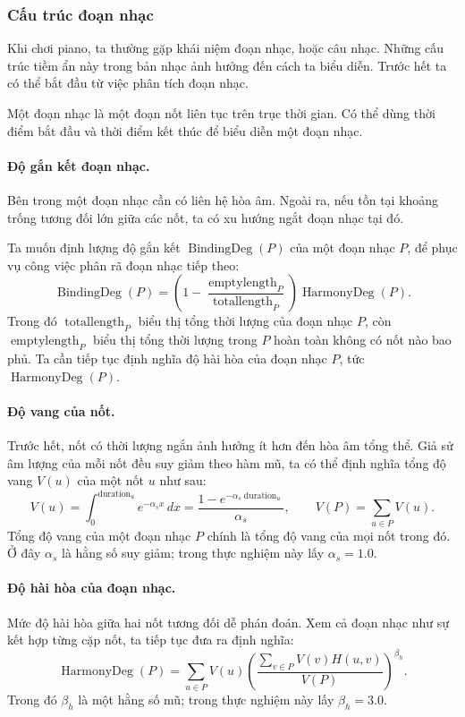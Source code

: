 \documentclass[11pt]{article}
\begin{document}
\subsubsection{Cấu trúc đoạn nhạc}

Khi chơi piano, ta thường gặp khái niệm đoạn nhạc, hoặc câu nhạc. Những cấu
trúc tiềm ẩn này trong bản nhạc ảnh hưởng đến cách ta biểu diễn. Trước hết ta
có thể bắt đầu từ việc phân tích đoạn nhạc.

Một đoạn nhạc là một đoạn nốt liên tục trên trục thời gian. Có thể dùng thời
điểm bắt đầu và thời điểm kết thúc để biểu diễn một đoạn nhạc.

\paragraph{Độ gắn kết đoạn nhạc.}
Bên trong một đoạn nhạc cần có liên hệ hòa âm. Ngoài ra, nếu tồn tại khoảng
trống tương đối lớn giữa các nốt, ta có xu hướng ngắt đoạn nhạc tại đó.

Ta muốn định lượng độ gắn kết \(\operatorname{BindingDeg}(P)\) của một đoạn
nhạc \(P\), để phục vụ công việc phân rã đoạn nhạc tiếp theo:
\[
  \operatorname{BindingDeg}(P)=
  \left(1-\frac{\operatorname{emptylength}_P}
  {\operatorname{totallength}_P}\right)\operatorname{HarmonyDeg}(P).
\]
Trong đó \(\operatorname{totallength}_P\) biểu thị tổng thời lượng của đoạn
nhạc \(P\), còn \(\operatorname{emptylength}_P\) biểu thị tổng thời lượng
trong \(P\) hoàn toàn không có nốt nào bao phủ. Ta cần tiếp tục định nghĩa độ
hài hòa của đoạn nhạc \(P\), tức \(\operatorname{HarmonyDeg}(P)\).

\paragraph{Độ vang của nốt.}
Trước hết, nốt có thời lượng ngắn ảnh hưởng ít hơn đến hòa âm tổng thể. Giả
sử âm lượng của mỗi nốt đều suy giảm theo hàm mũ, ta có thể định nghĩa tổng
độ vang \(V(u)\) của một nốt \(u\) như sau:
\[
  V(u)=\int_0^{\operatorname{duration}_u}e^{-\alpha_s x}\,dx
      =\frac{1-e^{-\alpha_s\operatorname{duration}_u}}{\alpha_s},
  \qquad
  V(P)=\sum_{u\in P}V(u).
\]
Tổng độ vang của một đoạn nhạc \(P\) chính là tổng độ vang của mọi nốt trong
đó. Ở đây \(\alpha_s\) là hằng số suy giảm; trong thực nghiệm này lấy
\(\alpha_s=1.0\).

\paragraph{Độ hài hòa của đoạn nhạc.}
Mức độ hài hòa giữa hai nốt tương đối dễ phán đoán. Xem cả đoạn nhạc như sự
kết hợp từng cặp nốt, ta tiếp tục đưa ra định nghĩa:
\[
  \operatorname{HarmonyDeg}(P)=
  \sum_{u\in P}V(u)
  \left(\frac{\sum_{v\in P}V(v)H(u,v)}{V(P)}\right)^{\beta_h}.
\]
Trong đó \(\beta_h\) là một hằng số mũ; trong thực nghiệm này lấy
\(\beta_h=3.0\).
\end{document}
